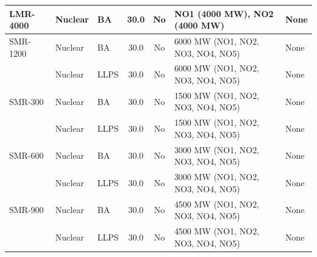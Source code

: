 \begin{table}[htbp]
\begin{tabular}{lllccll}
\hline
LMR-4000 & Nuclear & BA & 30.0 & No & NO1 (4000 MW), NO2 (4000 MW) & None \\
\hline
SMR-1200 & Nuclear & BA & 30.0 & No & 6000 MW (NO1, NO2, NO3, NO4, NO5) & None \\
 & Nuclear & LLPS & 30.0 & No & 6000 MW (NO1, NO2, NO3, NO4, NO5) & None \\
\hline
SMR-300 & Nuclear & BA & 30.0 & No & 1500 MW (NO1, NO2, NO3, NO4, NO5) & None \\
 & Nuclear & LLPS & 30.0 & No & 1500 MW (NO1, NO2, NO3, NO4, NO5) & None \\
\hline
SMR-600 & Nuclear & BA & 30.0 & No & 3000 MW (NO1, NO2, NO3, NO4, NO5) & None \\
 & Nuclear & LLPS & 30.0 & No & 3000 MW (NO1, NO2, NO3, NO4, NO5) & None \\
\hline
SMR-900 & Nuclear & BA & 30.0 & No & 4500 MW (NO1, NO2, NO3, NO4, NO5) & None \\
 & Nuclear & LLPS & 30.0 & No & 4500 MW (NO1, NO2, NO3, NO4, NO5) & None \\
\hline
\end{tabular}
\end{table}